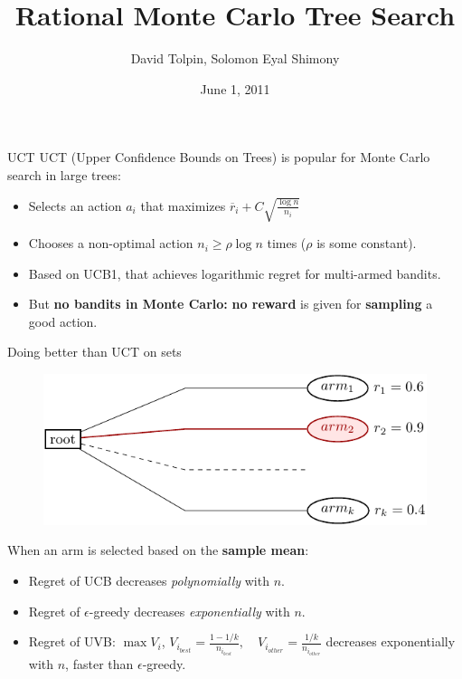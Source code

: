 \documentclass{beamer}
\title{Rational Monte Carlo Tree Search}
\author{David Tolpin, Solomon Eyal Shimony}
\institute{Ben-Gurion University of the Negev\\Beer Sheva, Israel}
\date{June 1, 2011}
\begin{document}
\begin{frame}
\titlepage
\end{frame}

\begin{frame}{UCT}
UCT (Upper Confidence Bounds on Trees) is popular for Monte
  Carlo search in large trees:
\begin{itemize}
\item Selects an action $a_i$ that maximizes $\overline r_i + C\sqrt
  {\frac {\log n} {n_i}}$
\item Chooses a non-optimal action $n_i\ge\rho\log n$ times ($\rho$ is
  some constant).
\item Based on UCB1, that achieves logarithmic regret for multi-armed
  bandits.
\item But {\bf{\Large no bandits in Monte Carlo:}} {\bf no reward} is given for {\bf
  sampling} a good action.
\end{itemize}
\end{frame}

\begin{frame}{Doing better than UCT on sets}
\begin{figure}[h]
\centering
\includegraphics[scale=0.8]{onelevel-tree.pdf}
\end{figure}
When an arm is selected based on the {\bf sample mean}:
\begin{itemize}
\item Regret of UCB decreases {\it polynomially} with $n$.
\item Regret of $\epsilon$-greedy decreases {\it exponentially} with
  $n$.
\item Regret of UVB: $\max V_i$, $V_{i_{best}}=\frac {1-1/k}
  {n_{i_{best}}},\quad V_{i_{other}}=\frac {1/k} {n_{i_{other}}}$
  decreases exponentially with $n$, faster than $\epsilon$-greedy.
\end{itemize}
\end{frame}
\end{document}
